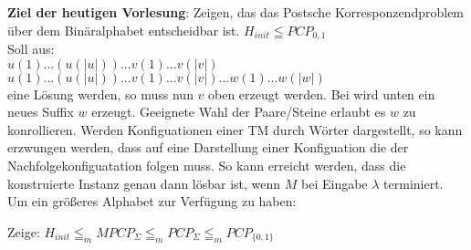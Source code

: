 
\textbf{Ziel der heutigen Vorlesung}: Zeigen, das das Postsche Korresponzendproblem über dem Binäralphabet entscheidbar ist. 
$H_{init} \leqq PCP_{0,1}$ \\

Soll aus: \\
$u(1)...(u(|u|))...v(1)...v(|v|)$ \\
$u(1)...(u(|u|))...v(1)...v(|v|)...w(1)...w(|w|)$ \\

eine Lösung werden, so muss nun $v$ oben erzeugt werden. Bei wird unten ein neues Suffix $w$ erzeugt.
Geeignete Wahl der Paare/Steine erlaubt es $w$ zu konrollieren. Werden Konfiguationen einer TM durch Wörter
dargestellt, so kann erzwungen werden, dass auf eine Darstellung einer Konfiguation die der Nachfolgekonfiguatation
folgen muss. So kann erreicht werden, dass die konstruierte Instanz genau dann lösbar ist, wenn $M$
bei Eingabe $\lambda$ terminiert. \\

Um ein größeres Alphabet zur Verfügung zu haben:

Zeige: $H_{init} \leqq_m MPCP_\Sigma \leqq_m PCP_\Sigma \leqq_m PCP_{\{0,1\}}$

